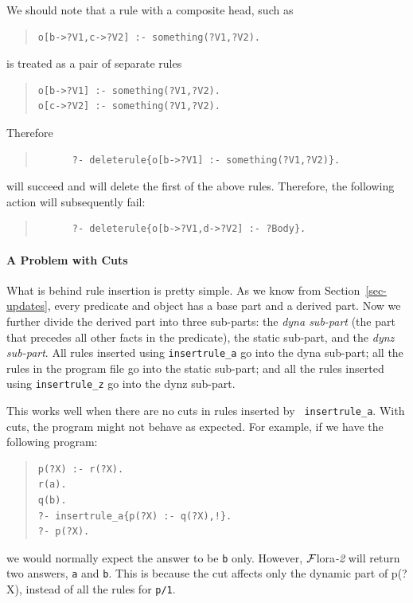 \documentclass[11pt]{article}
\newcommand{\FLSYSTEM}{{\mbox{\sc ${\cal F}${lora}\rm\emph{-2}}}\xspace}
\begin{document}
We should note that a rule with a composite head, such as 
\begin{quote}
   \begin{verbatim}
o[b->?V1,c->?V2] :- something(?V1,?V2).     
   \end{verbatim}
\end{quote}
is treated as a pair of separate rules
\begin{quote}
\begin{verbatim}
o[b->?V1] :- something(?V1,?V2).     
o[c->?V2] :- something(?V1,?V2).     
\end{verbatim}
\end{quote}
Therefore
\begin{quote}
\begin{verbatim}
      ?- deleterule{o[b->?V1] :- something(?V1,?V2)}.
\end{verbatim}
\end{quote}
will succeed and will delete the first of the above rules.
Therefore, the following action will subsequently fail:
\begin{quote}
\begin{verbatim}
      ?- deleterule{o[b->?V1,d->?V2] :- ?Body}.
\end{verbatim}
\end{quote}



\paragraph{A Problem with Cuts} What is behind rule insertion is pretty
simple. As we know from Section~\ref{sec-updates}, every predicate and
object has a base part and a derived part. Now we further divide the
derived part into three sub-parts: the \emph{dyna sub-part} (the part that
precedes all other facts in the predicate), the static sub-part, and the
\emph{dynz sub-part}. All rules inserted using {\tt insertrule\_a} go into
the dyna sub-part; all the rules in the program file go into the static
sub-part; and all the rules inserted using {\tt insertrule\_z} go into the
dynz sub-part.

This works well when there are no cuts in rules inserted by {\tt
  insertrule\_a}. With cuts, the program might not
behave as expected. For example, if we have the following program:
\begin{quote}
\begin{verbatim}
p(?X) :- r(?X).
r(a).
q(b).
?- insertrule_a{p(?X) :- q(?X),!}.
?- p(?X).
\end{verbatim}
\end{quote}
\noindent
we would normally expect the answer to be {\tt b} only. However, \FLSYSTEM will
return two answers, {\tt a} and {\tt b}. This is because the cut affects
only the dynamic part of p(?X), instead of all the rules for {\tt p/1}.
\end{document}
